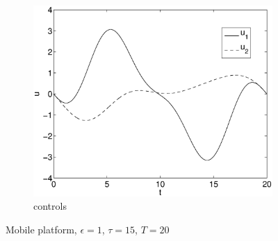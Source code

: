 \begin{figure}[h]
\begin{subfigure}[b]{\textwidth}
\centering
\includegraphics[height=0.3\textheight]{img/final_15_1_20_u.eps}
\caption{controls}
\end{subfigure}
\caption{Mobile platform, $\epsilon=1$, $\tau=15$, $T=20$}
\label{fig:pl2}
\end{figure}


